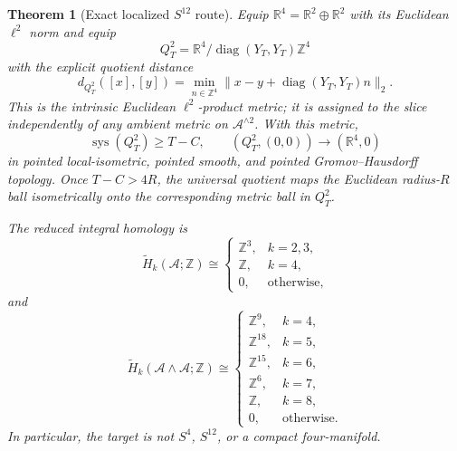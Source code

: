 \documentclass[11pt,letterpaper]{article}
\numberwithin{equation}{section}
\newtheorem{theorem}{Theorem}[section]
\theoremstyle{definition}
\theoremstyle{remark}
\newcommand{\R}{\mathbb R}
\newcommand{\Z}{\mathbb Z}
\newcommand{\sys}{\operatorname{sys}}
\begin{document}
\begin{theorem}[Exact localized $S^{12}$ route]
Equip \(\R^4=\R^2\oplus\R^2\) with its Euclidean \(\ell^2\) norm and
equip
\[
 Q_T^2=\R^4/\operatorname{diag}(Y_T,Y_T)\Z^4
\]
with the explicit quotient distance
\begin{equation}
 d_{Q_T^2}([x],[y])
 =\min_{n\in\Z^4}
   \|x-y+\operatorname{diag}(Y_T,Y_T)n\|_2.
 \label{eq:Q-product-metric}
\end{equation}
This is the intrinsic Euclidean \(\ell^2\)-product metric; it is assigned
to the slice independently of any ambient metric on
\(\mathcal A^{\wedge2}\).  With this metric,
\begin{equation}
 \sys(Q_T^2)\ge T-C,\qquad
 (Q_T^2,(0,0))\longrightarrow(\R^4,0)
 \label{eq:S12-limit}
\end{equation}
in pointed local-isometric, pointed smooth, and pointed
Gromov--Hausdorff topology.  Once $T-C>4R$, the universal quotient maps
the Euclidean radius-$R$ ball isometrically \emph{onto} the corresponding
metric ball in \(Q_T^2\).

The reduced integral homology is
\begin{equation}
 \widetilde H_k(\mathcal A;\Z)\cong
 \begin{cases}
 \Z^3,&k=2,3,\\
 \Z,&k=4,\\
 0,&\text{otherwise},
 \end{cases}
 \label{eq:A-homology}
\end{equation}
and
\begin{equation}
 \widetilde H_k(\mathcal A\wedge\mathcal A;\Z)\cong
 \begin{cases}
 \Z^9,&k=4,\\
 \Z^{18},&k=5,\\
 \Z^{15},&k=6,\\
 \Z^6,&k=7,\\
 \Z,&k=8,\\
 0,&\text{otherwise}.
 \end{cases}
 \label{eq:A-smash-homology}
\end{equation}
In particular, the target is not $S^4$, $S^{12}$, or a compact
four-manifold.
\end{theorem}
\end{document}
